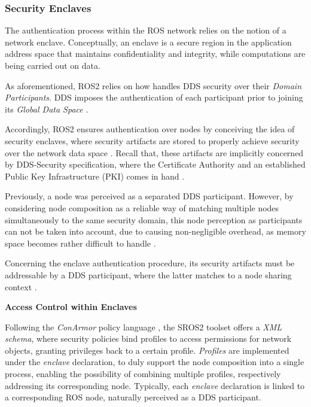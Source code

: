 \subsubsection{Security Enclaves}

The authentication process within the ROS network relies on the notion of a network enclave. Conceptually, an enclave is a secure region in the application address space that maintains confidentiality and integrity, while computations are being carried out on data.

As aforementioned, ROS2 relies on how handles DDS security over their \textit{Domain Participants}. DDS imposes the authentication of each participant prior to joining its \textit{Global Data Space} \cite{white2019network}.

Accordingly, ROS2 ensures authentication over nodes by conceiving the idea of security enclaves, where security artifacts are stored to properly achieve security over the network data space \cite{ros-security-enclaves}. Recall that, these artifacts are implicitly concerned by DDS-Security specification, where the Certificate Authority and an established Public Key Infrastructure (PKI) comes in hand \cite{white2019network, white2016sros}. 

Previously, a node was perceived as a separated DDS participant. However, by considering node composition as a reliable way of matching multiple nodes simultaneously to the same security domain, this node perception as participants can not be taken into account, due to causing non-negligible overhead, as memory space becomes rather difficult to handle \cite{ros-security-enclaves, ros-access-control}.

Concerning the enclave authentication procedure, its security artifacts must be addressable by a DDS participant, where the latter matches to a node sharing context \cite{ros-security-enclaves}.
 
\vspace{0.5cm}
\textbf{Access Control within Enclaves}

Following the \textit{ConArmor} policy language \cite{white2018procedurally}, the SROS2 toolset offers a \textit{XML schema}, where security policies bind profiles to access permissions for network objects, granting privileges back to a certain profile. \textit{Profiles} are implemented under the \textit{enclave} declaration, to duly support the node composition into a single process, enabling the possibility of combining multiple profiles, respectively addressing its corresponding node. Typically, each \textit{enclave} declaration is linked to a corresponding ROS node, naturally perceived as a DDS participant.

